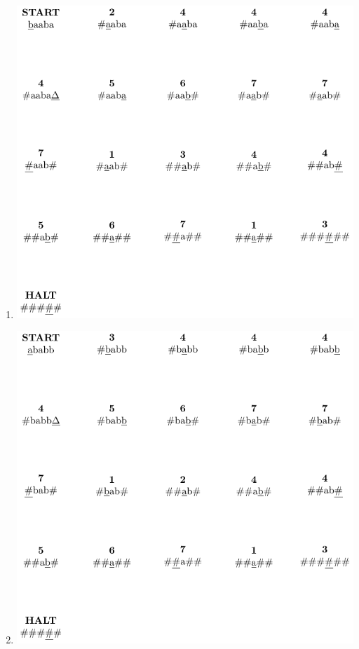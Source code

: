 \begin{solution}
    \begin{enumerate}[label=\alph*)]
        \item \includegraphics[]{figures/answer4a.pdf}
        \item \includegraphics[]{figures/answer4b.pdf}
    \end{enumerate}
\end{solution}
